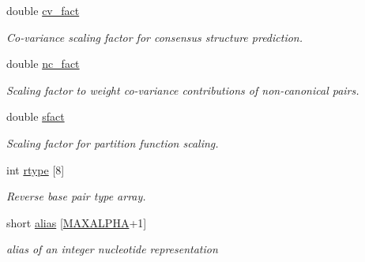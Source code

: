 \begin{DoxyCompactItemize}
\mbox{\label{group__model__details_a62ebefb9d0643e5c4c8a2ec84a105ce6}} 
double \hyperlink{group__model__details_a62ebefb9d0643e5c4c8a2ec84a105ce6}{cv\+\_\+fact}
\begin{DoxyCompactList}\small\item\em Co-\/variance scaling factor for consensus structure prediction. \end{DoxyCompactList}\item 
\mbox{\label{group__model__details_abcf568e6124bfcb2f847ff4eb0dfded6}} 
double \hyperlink{group__model__details_abcf568e6124bfcb2f847ff4eb0dfded6}{nc\+\_\+fact}
\begin{DoxyCompactList}\small\item\em Scaling factor to weight co-\/variance contributions of non-\/canonical pairs. \end{DoxyCompactList}\item 
\mbox{\label{group__model__details_ab6f4cabaa9b4726b13592486d5bc21c7}} 
double \hyperlink{group__model__details_ab6f4cabaa9b4726b13592486d5bc21c7}{sfact}
\begin{DoxyCompactList}\small\item\em Scaling factor for partition function scaling. \end{DoxyCompactList}\item 
\mbox{\label{group__model__details_ad082d0fea31e002b90cdfe5e6382f8b0}} 
int \hyperlink{group__model__details_ad082d0fea31e002b90cdfe5e6382f8b0}{rtype} \mbox{[}8\mbox{]}
\begin{DoxyCompactList}\small\item\em Reverse base pair type array. \end{DoxyCompactList}\item 
\mbox{\label{group__model__details_a66136cf9abc8ff790ec0d33245d68fd5}} 
short \hyperlink{group__model__details_a66136cf9abc8ff790ec0d33245d68fd5}{alias} \mbox{[}\hyperlink{group__model__details_ga05a5ffe718aa431d97419a12fb082379}{M\+A\+X\+A\+L\+P\+HA}+1\mbox{]}
\begin{DoxyCompactList}\small\item\em alias of an integer nucleotide representation \end{DoxyCompactList}\item 

\end{DoxyCompactItemize}

